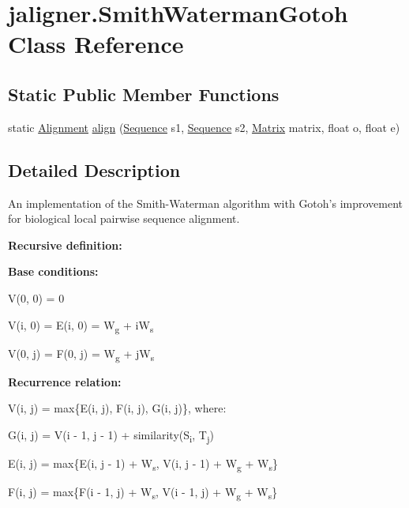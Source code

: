 \hypertarget{classjaligner_1_1_smith_waterman_gotoh}{\section{jaligner.\+Smith\+Waterman\+Gotoh Class Reference}
\label{classjaligner_1_1_smith_waterman_gotoh}
}
\subsection*{Static Public Member Functions}
\begin{DoxyCompactItemize}
\item 
static \hyperlink{classjaligner_1_1_alignment}{Alignment} \hyperlink{classjaligner_1_1_smith_waterman_gotoh_ad1c29c75816ad909e66f2134e7053874}{align} (\hyperlink{classjaligner_1_1_sequence}{Sequence} s1, \hyperlink{classjaligner_1_1_sequence}{Sequence} s2, \hyperlink{classjaligner_1_1matrix_1_1_matrix}{Matrix} matrix, float o, float e)
\end{DoxyCompactItemize}


\subsection{Detailed Description}
An implementation of the Smith-\/\+Waterman algorithm with Gotoh's improvement for biological local pairwise sequence alignment.

{\bfseries Recursive definition\+:} 
\begin{DoxyItemize}
\item {\bfseries Base conditions\+:} 
\begin{DoxyItemize}
\item {\ttfamily V(0, 0) = 0} 
\item {\ttfamily V(i, 0) = E(i, 0) = W\textsubscript{g} + i\+W\textsubscript{s}} 
\item {\ttfamily V(0, j) = F(0, j) = W\textsubscript{g} + j\+W\textsubscript{s}} 
\end{DoxyItemize}
\item {\bfseries Recurrence relation\+:} 
\begin{DoxyItemize}
\item {\ttfamily V(i, j) = max\{E(i, j), F(i, j), G(i, j)\}}, where\+: 
\item {\ttfamily G(i, j) = V(i -\/ 1, j -\/ 1) + similarity(S\textsubscript{i}, T\textsubscript{j})} 
\item {\ttfamily E(i, j) = max\{E(i, j -\/ 1) + W\textsubscript{s}, V(i, j -\/ 1) + W\textsubscript{g} + W\textsubscript{s}\}} 
\item {\ttfamily F(i, j) = max\{F(i -\/ 1, j) + W\textsubscript{s}, V(i -\/ 1, j) + W\textsubscript{g} + W\textsubscript{s}\}} 
\end{DoxyItemize}
\end{DoxyItemize}

